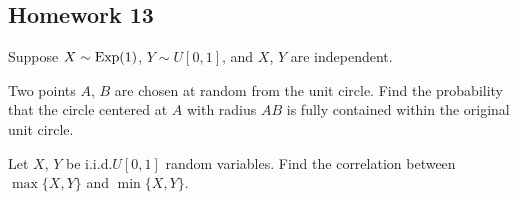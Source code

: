 \subsection{Homework 13}
\begin{problem}[Handout 17, \# 16]
  Suppose \(X\sim\operatorname{Exp}(1)\), \(Y\sim U[0,1]\), and \(X\), \(Y\) are
  independent.
  \begin{alphlist}
  \item
  \end{alphlist}
\end{problem}
\begin{solution}

\end{solution}

\begin{problem}[Handout 17, \# 18]
  Two points \(A\), \(B\) are chosen at random from the unit circle. Find
  the probability that the circle centered at \(A\) with radius \(AB\) is
  fully contained within the original unit circle.
\end{problem}
\begin{solution}
\end{solution}

\begin{problem}[Handout 17, \# 19]
  Let \(X\), \(Y\) be i.i.d.\@ \(U[0,1]\) random variables. Find the
  correlation between \(\max\{X,Y\}\) and \(\min\{X,Y\}\).
\end{problem}
\begin{solution}
\end{solution}

